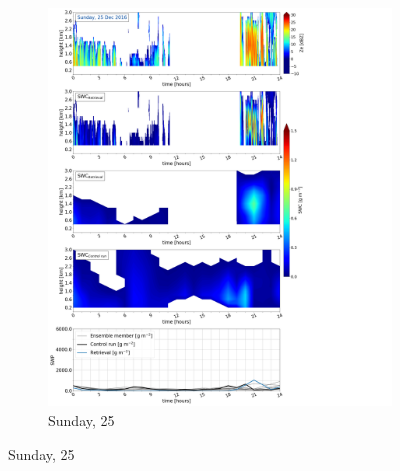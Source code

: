     \begin{figure}\ContinuedFloat
   		\centering
		\begin{subfigure}[b]{0.8\textwidth}
			\includegraphics[trim={0.5cm 0.5cm 17.5cm .5cm},clip,width=\textwidth]{./fig_SWC/20161225}
			\caption{Sunday, \SI{25}{\dec}}\label{fig:SWC25}
		\end{subfigure}
	\end{figure}
